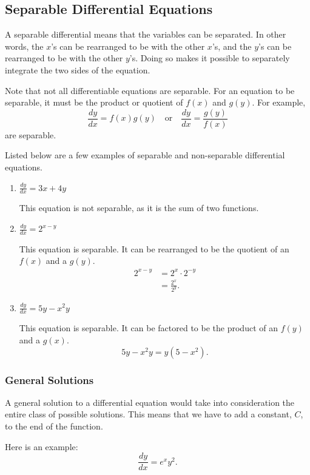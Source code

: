 \documentclass[12pt]{article}
\begin{document}
\subsection{Separable Differential Equations}
A separable differential means that the variables can be separated. In other words, the $x$'s can be rearranged to be with the other $x$'s, and the $y$'s can be rearranged to be with the other $y$'s. Doing so makes it possible to separately integrate the two sides of the equation.

Note that not all differentiable equations are separable. For an equation to be separable, it must be the product or quotient of $f(x)$ and $g(y)$. For example,
\[ \frac{dy}{dx} = f(x) g(y) \quad \text{or} \quad \frac{dy}{dx} = \frac{g(y)}{f(x)} \]
are separable.

Listed below are a few examples of separable and non-separable differential equations.
\begin{enumerate}
    \item $\frac{dy}{dx} = 3x + 4y$

          This equation is not separable, as it is the sum of two functions.
          \bigskip

    \item $\frac{dy}{dx} = 2^{x-y}$

          This equation is separable. It can be rearranged to be the quotient of an $f(x)$ and a $g(y)$.
          \begin{align*}
              2^{x-y} & = 2^x \cdot 2^{-y} \\
                      & = \frac{2^x}{2^y}.
          \end{align*}

    \item $\frac{dy}{dx} = 5y - x^2 y$

          This equation is separable. It can be factored to be the product of an $f(y)$ and a $g(x)$.
          \[ 5y - x^2 y = y(5-x^2). \]
\end{enumerate}

\subsubsection{General Solutions}
A general solution to a differential equation would take into consideration the entire class of possible solutions. This means that we have to add a constant, $C$, to the end of the function.

\noindent Here is an example:
\[ \frac{dy}{dx} = e^x y^2. \]
\end{document}
